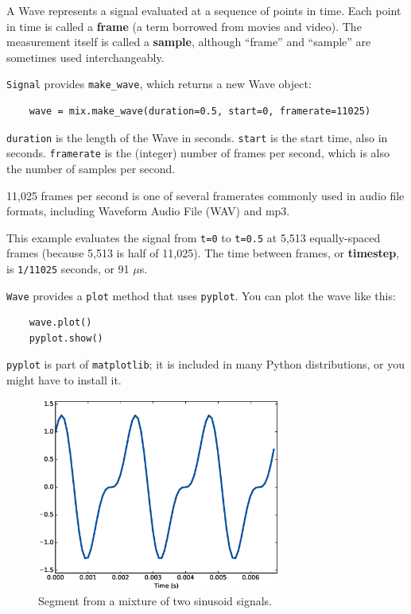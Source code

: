 \documentclass[12pt]{book}
\begin{document}
A Wave represents a signal evaluated at a sequence of points in
time.  Each point in time is called a {\bf frame} (a term borrowed
from movies and video).  The measurement itself is called a
{\bf sample}, although ``frame'' and ``sample'' are sometimes
used interchangeably.

{\tt Signal} provides \verb"make_wave", which returns a new
Wave object:

\begin{verbatim}
    wave = mix.make_wave(duration=0.5, start=0, framerate=11025)
\end{verbatim}

{\tt duration} is the length of the Wave in seconds.  {\tt start} is
the start time, also in seconds.  {\tt framerate} is the (integer)
number of frames per second, which is also the number of samples
per second.

11,025 frames per second is one of several framerates commonly used in
audio file formats, including Waveform Audio File (WAV) and mp3. 

This example evaluates the signal from {\tt t=0} to {\tt t=0.5} at
5,513 equally-spaced frames (because 5,513 is half of 11,025).
The time between frames, or {\bf timestep}, is {\tt 1/11025} seconds, or
91 $\mu$s.

{\tt Wave} provides a {\tt plot} method that uses {\tt pyplot}.
You can plot the wave like this:

\begin{verbatim}
    wave.plot()
    pyplot.show()
\end{verbatim}

{\tt pyplot} is part of {\tt matplotlib}; it is included in many
Python distributions, or you might have to install it.

\begin{figure}
\centerline{\includegraphics[height=2.5in]{figs/sounds4.eps}}
\caption{Segment from a mixture of two sinusoid signals.}
\label{fig.sounds4}
\end{figure}
\end{document}

